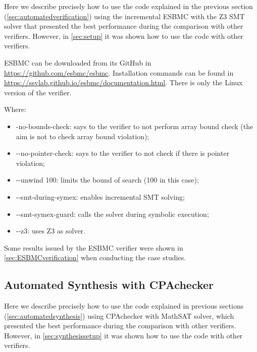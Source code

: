 Here we describe precisely how to use the code explained in the previous section (\ref{sec:automatedverification}) using the incremental ESBMC with the Z3 SMT solver that presented the best performance during the comparison with other verifiers. However, in \ref{sec:setup} it was shown how to use the code with other verifiers.

ESBMC can be downloaded from its GitHub in \url{https://github.com/esbmc/esbmc}. Installation commands can be found in \url{https://ssvlab.github.io/esbmc/documentation.html}. There is only the Linux version of the verifier.

\bigskip
{}
\bigskip

Where:
\begin{itemize}
\item -no-bounds-check: says to the verifier to not perform array bound check (the aim is not to check array bound violation);
\item -\phantom{}-no-pointer-check: says to the verifier to not check if there is pointer violation;
\item -\phantom{}-unwind 100: limits the bound of search (100 in this case);
\item -\phantom{}-smt-during-symex: enables incremental SMT solving;
\item -\phantom{}-smt-symex-guard: calls the solver during symbolic execution;
\item -\phantom{}-z3: uses Z3 as solver.
\end{itemize}

Some results issued by the ESBMC verifier were shown in \ref{sec:ESBMCverification} when conducting the case studies.

\subsection{Automated Synthesis with CPAchecker}

Here we describe precisely how to use the code explained in previous sections (\ref{sec:automatedsynthesis}) using CPAchecker with MathSAT solver, which presented the best performance during the comparison with other verifiers. However, in \ref{sec:synthesissetup} it was shown how to use the code with other verifiers.

